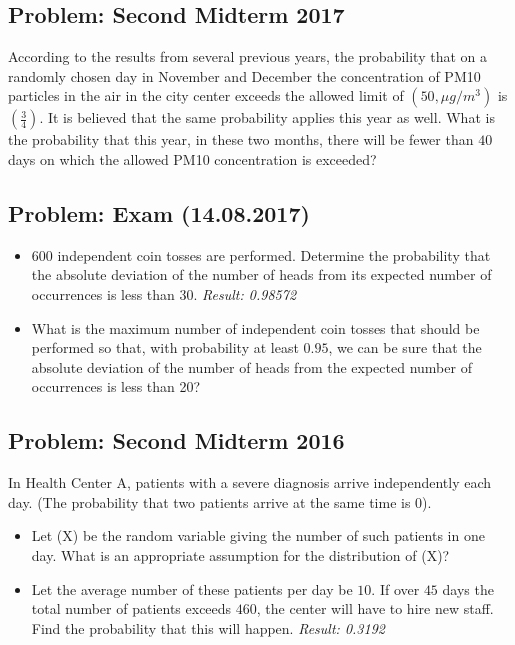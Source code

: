 \documentclass[a4paper, 12pt]{article}
\begin{document}
\subsection{Problem: Second Midterm 2017}
According to the results from several previous years, the probability that on a randomly chosen day in November and December the concentration of PM10 particles in the air in the city center exceeds the allowed limit of $(50,\mu g/m^3)$ is $(\frac{3}{4})$. It is believed that the same probability applies this year as well. What is the probability that this year, in these two months, there will be fewer than $40$ days on which the allowed PM10 concentration is exceeded?



\subsection{Problem: Exam (14.08.2017)}
\begin{itemize}
  
\item [a)] $600$ independent coin tosses are performed. Determine the probability that the absolute deviation of the number of heads from its expected number of occurrences is less than $30$.
\textit{Result: {0.98572}}
\item [b)] What is the maximum number of independent coin tosses that should be performed so that, with probability at least $0.95$, we can be sure that the absolute deviation of the number of heads from the expected number of occurrences is less than 20?

\end{itemize}



\subsection{Problem: Second Midterm 2016}
In Health Center A, patients with a severe diagnosis arrive independently each day. (The probability that two patients arrive at the same time is $0$).

\begin{itemize}
  
\item [a)] Let (X) be the random variable giving the number of such patients in one day. What is an appropriate assumption for the distribution of (X)?
\item [b)] Let the average number of these patients per day be $10$. If over $45$ days the total number of patients exceeds $460$, the center will have to hire new staff. Find the probability that this will happen.
\textit{Result: {0.3192}}

\end{itemize}
\end{document}
